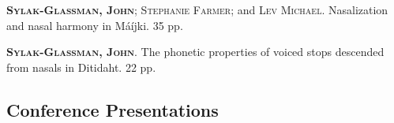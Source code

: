 \documentclass[11pt]{article}
\renewcommand{\bf}[1]{\textbf{#1}}
\newcommand{\ca}[1]{\textsc{#1}}
\begin{document}
\begin{reflist}
\ca{\bf{Sylak-Glassman, John}; Stephanie Farmer;} and \ca{Lev Michael}. Nasalization and nasal harmony in M\'a\'ij\textbari ki. 35 pp.

\ca{\bf{Sylak-Glassman, John}}. The phonetic properties of voiced stops descended from nasals in Ditidaht. 22 pp.


\end{reflist}



\subsection*{Conference Presentations}
\end{document}
